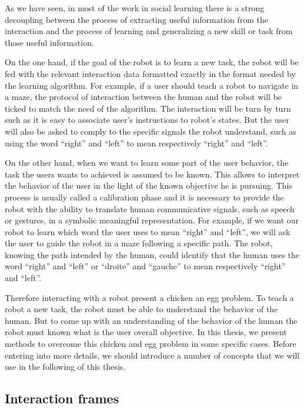 As we have seen, in most of the work in social learning there is a strong decoupling between the process of extracting useful information from the interaction and the process of learning and generalizing a new skill or task from those useful information.

On the one hand, if the goal of the robot is to learn a new task, the robot will be fed with the relevant interaction data formatted exactly in the format needed by the learning algorithm. For example, if a user should teach a robot to navigate in a maze, the protocol of interaction between the human and the robot will be ticked to match the need of the algorithm. The interaction will be turn by turn such as it is easy to associate user's instructions to robot's states. But the user will also be asked to comply to the specific signals the robot understand, such as using the word ``right'' and ``left'' to mean respectively ``right'' and ``left''.

On the other hand, when we want to learn some part of the user behavior, the task the users wants to achieved is assumed to be known. This allows to interpret the behavior of the user in the light of the known objective he is pursuing. This process is usually called a calibration phase and it is necessary to provide the robot with the ability to translate human communicative signals, such as speech or gestures, in a symbolic meaningful representation. For example, if we want our robot to learn which word the user uses to mean ``right'' and ``left'', we will ask the user to guide the robot in a maze following a specific path. The robot, knowing the path intended by the human, could identify that the human uses the word ``right'' and ``left'' or ``droite'' and ``gauche'' to mean respectively ``right'' and ``left''.

Therefore interacting with a robot present a chicken an egg problem. To teach a robot a new task, the robot must be able to understand the behavior of the human. But to come up with an understanding of the behavior of the human the robot must known what is the user overall objective. In this thesis, we present methods to overcome this chicken and egg problem in some specific cases. Before entering into more details, we should introduce a number of concepts that we will use in the following of this thesis.

\subsection{Interaction frames}

